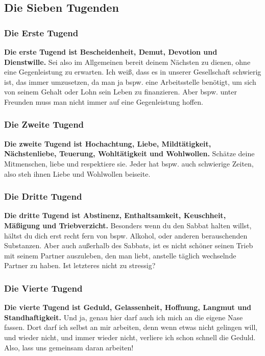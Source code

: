 \documentclass[12pt,a5paper]{article}
\begin{document}
	\subsection{Die Sieben Tugenden}
	
	\subsubsection{Die Erste Tugend}
		\textbf{Die erste Tugend ist Bescheidenheit,
		Demut,
		Devotion und Dienstwille.}
		Sei also im Allgemeinen bereit deinem N\"achsten zu dienen,
		ohne eine Gegenleistung zu erwarten.
		Ich wei{\ss},
		dass es in unserer Gesellschaft schwierig ist,
		das immer umzusetzen,
		da man ja bspw. eine Arbeitsstelle ben\"otigt,
		um sich von seinem Gehalt oder Lohn sein Leben zu finanzieren.
		Aber bspw. unter Freunden muss man nicht immer auf eine Gegenleistung hoffen.

	\subsubsection{Die Zweite Tugend}
		\textbf{Die zweite Tugend ist Hochachtung,
		Liebe,
		Mildt\"atigkeit,
		N\"achstenliebe,
		Teuerung,
		Wohlt\"atigkeit
		und Wohlwollen.}
		Sch\"atze deine Mitmenschen,
		liebe und respektiere sie.
		Jeder hat bspw. auch schwierige Zeiten,
		also steh ihnen Liebe und Wohlwollen beiseite.
	
	\subsubsection{Die Dritte Tugend}
		\textbf{Die dritte Tugend ist Abstinenz,
		Enthaltsamkeit,
		Keuschheit,
		M\"a{\ss}igung und Triebverzicht.}
		Besonders wenn du den Sabbat halten willst,
		h\"altst du dich erst recht fern von bspw. Alkohol,
		oder anderen berauschenden Substanzen.
		Aber auch au{\ss}erhalb des Sabbats,
		ist es nicht sch\"oner seinen Trieb mit seinem Partner auszuleben,
		den man liebt,
		anstelle t\"aglich wechselnde Partner zu haben.
		Ist letzteres nicht zu stressig?

	\subsubsection{Die Vierte Tugend}
		\textbf{Die vierte Tugend ist Geduld,
		Gelassenheit,
		Hoffnung,
		Langmut und Standhaftigkeit.}
		Und ja,
		genau hier darf auch ich mich an die eigene Nase fassen.
		Dort darf ich selbst an mir arbeiten,
		denn wenn etwas nicht gelingen will,
		und wieder nicht,
		und immer wieder nicht,
		verliere ich schon schnell die Geduld.
		Also,
		lass uns gemeinsam daran arbeiten!
\end{document}
